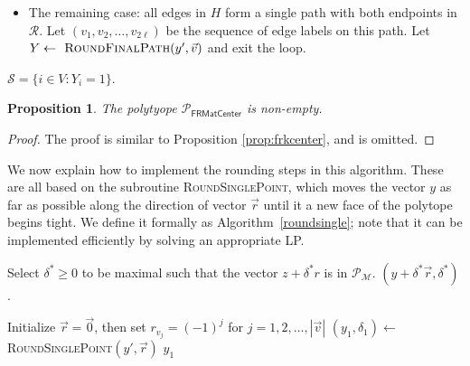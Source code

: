 \documentclass[a4paper,11pt]{article}
\newtheorem{proposition}[theorem]{Proposition}
\renewcommand{\S}{\mathcal{S}}
\newcommand{\R}{\mathcal{R}}
\newcommand{\M}{\mathcal{M}}
\renewcommand{\P}{\mathcal{P}}
\begin{document}
\begin{algorithm}[H]
\begin{algorithmic}[1]
\begin{itemize}[noitemsep,nolistsep]
		\item The remaining case: all edges in $H$ form a single path with both endpoints in $\R$. Let $(v_1, v_2, \ldots, v_{2\ell})$ be the sequence of edge labels on this path. Let $Y \gets \textsc{ RoundFinalPath}(y', \vec{v})$ and exit the loop.
	\end{itemize}
\ENDWHILE
\RETURN $\S = \{i \in V: Y_i = 1\}$.
\end{algorithmic} 
\label{algo:frmcenter}
\end{algorithm}


\begin{proposition} The polytyope $\P_\textsf{FRMatCenter}$ is non-empty.
\end{proposition}
\begin{proof}
The proof is similar to Proposition \ref{prop:frkcenter}, and is omitted.
\end{proof}

We now explain how to implement the rounding steps in this algorithm. These are all based on the subroutine \textsc{RoundSinglePoint}, which moves the vector $y$ as far as possible along the direction of vector $\vec r$ until it a new face of the polytope begins tight. We define it formally as Algorithm~\ref{roundsingle}; note that it can be implemented efficiently by solving an appropriate LP.

\begin{algorithm}[H]
\caption{$\textsc{RoundSinglePoint}\left(y, \vec{r} \right)$}
\begin{algorithmic}[1]
\STATE Select $\delta^* \geq 0$ to be maximal such that the vector $z + \delta^* r$ is in $\P_{\M}$.
\RETURN $(y + \delta^* \vec{r}, \delta^*)$.
\end{algorithmic} 
\label{roundsingle}
\end{algorithm}

\begin{algorithm}[H]
\caption{$\textsc{RoundCycle}\left(y', \vec{v} \right)$}
\begin{algorithmic}[1]
\STATE Initialize $\vec{r} = \vec{0}$, then set $r_{v_j} = (-1)^j$ for $j = 1,2, \ldots, |\vec{v}|$
\STATE $(y_1, \delta_1) \gets $\textsc{RoundSinglePoint}$(y', \vec{r})$
\RETURN $y_1$
\end{algorithmic} 
\end{algorithm}
\end{document}
